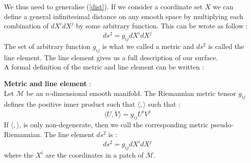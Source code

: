 \documentclass[a4paper,12pt]{article}
\theoremstyle{definition}
\begin{document}
We thus need to generalise (\ref{dist}).
If we consider a coordinate set $X$ we can define a general infinitesimal distance on any smooth space by multiplying each combination of $dX^idX^j$ by some arbitrary function.
This can be wrote as follow :
\begin{equation}
	ds^2=g_{ij}dX^idX^j
\end{equation}
The set of arbitrary function $g_{ij}$ is what we called a metric and $ds^2$ is called the line element.
The line element gives us a full description of our surface.\\
A formal definition of the metric and line element can be written :
\begin{definition}
	\textbf{Metric and line element} :\\
	Let $\mathcal{M}$ be an $n$-dimensional smooth manifold.
	The Riemannian metric tensor $g_{ij}$ defines the positive inner product such that $\langle , \rangle$ such that : 
	\begin{equation}
		\langle U , V \rangle = g_{ij}U^iV^j
	\end{equation}
	If $\langle , \rangle$, is only non-degenerate, then we call the corresponding metric pseudo-Riemannian.
	The line element $ds^2$ is :
	\begin{equation}
		ds^2=g_{ij}dX^idX^j
	\end{equation}
	where the $X^i$ are the coordinates in a patch of $\mathcal{M}$.
\end{definition}
\end{document}
